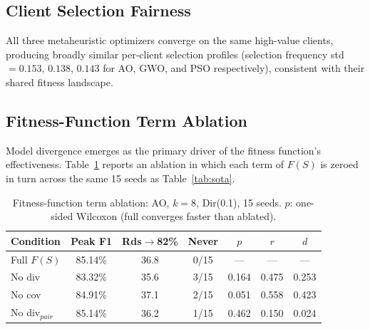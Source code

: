 \documentclass[conference]{IEEEtran}
\begin{document}
\subsection{Client Selection Fairness}
All three metaheuristic optimizers converge on the same high-value clients, producing broadly similar per-client selection profiles (selection frequency std$=0.153$, $0.138$, $0.143$ for AO, GWO, and PSO respectively), consistent with their shared fitness landscape.

\subsection{Fitness-Function Term Ablation}
Model divergence emerges as the primary driver of the fitness function's effectiveness. Table~\ref{tab:ablation} reports an ablation in which each term of $F(S)$ is zeroed in turn across the same 15 seeds as Table~\ref{tab:sota}.

\begin{table}[t]
\centering
\caption{Fitness-function term ablation: AO, $k=8$, Dir(0.1), 15 seeds. $p$: one-sided Wilcoxon (full converges faster than ablated).}
\label{tab:ablation}
\footnotesize
\setlength{\tabcolsep}{3pt}
\begin{tabular}{lcccccc}
\toprule
Condition & Peak F1 & Rds$\to$82\% & Never & $p$ & $r$ & $d$ \\
\midrule
Full $F(S)$          & 85.14\% & 36.8 & 0/15 & ---   & ---   & ---   \\
No div\;[$\alpha{=}0$]      & 83.32\% & 35.6 & 3/15 & 0.164 & 0.475 & 0.253 \\
No cov\;[$\beta{=}0$]       & 84.91\% & 37.1 & 2/15 & 0.051 & 0.558 & 0.423 \\
No div$_{pair}$\;[$\lambda{=}0$] & 85.14\% & 36.2 & 1/15 & 0.462 & 0.150 & 0.024 \\
\bottomrule
\end{tabular}
\end{table}
\end{document}
